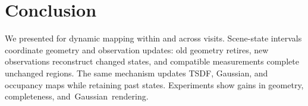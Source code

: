 \section{Conclusion}
\label{sec:conclusion}

We presented \ours for dynamic mapping within and across visits. Scene-state intervals coordinate geometry
and observation updates: old geometry retires, new observations reconstruct changed states, and compatible
measurements complete unchanged regions. The same mechanism updates
TSDF, Gaussian, and occupancy maps while retaining past states. Experiments show gains in geometry,
completeness, and~\mbox{Gaussian rendering}.

